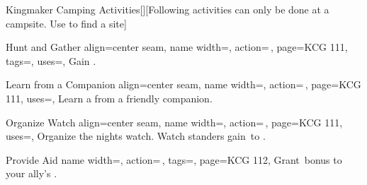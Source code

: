 \begin{PageFrontLandscape}
\begin{TablesHalf}{\frontTableHeight}
\begin{Table}{Kingmaker Camping Activities}[][Following activities can only be done at a campsite. Use
         to find a site]
\begin{entry}{Hunt and Gather}
{                align=center seam,
                name width=\activityLength,%
                action=\,,
                page=KCG 111,
                tags=\Move,
                uses={},
            }
                Gain . \hfill
                \\
                \hfill
                \hfill
            \end{entry}
            \begin{entry}{Learn from a Companion}{%
                align=center seam,
                name width=\activityLength,%
                action=\,,
                page=KCG 111,
                uses={\Perception[][val=20]},
            }
                Learn a  from a friendly companion. \hfill {}\\ \hfill {}
            \end{entry}
            \begin{entry}{Organize Watch}{%
                align=center seam,
                name width=\activityLength,%
                action=\,,
                page=KCG 111,
                uses={\Perception[tags=E]},
            }
                Organize the nights watch. Watch standers gain \,\Status to \PerceptionT. \\
                 \hfill
                \quad {}
            \end{entry}
            \begin{entry}{Provide Aid}{%
                name width=\activityLength,%
                action=\,,
                tags=\Concentrate,
                page=KCG 112,
            }
                Grant \,\Cirm bonus to your ally's . \hfill
                \quad
            \end{entry}

\end{Table}
\end{TablesHalf}
\end{PageFrontLandscape}
